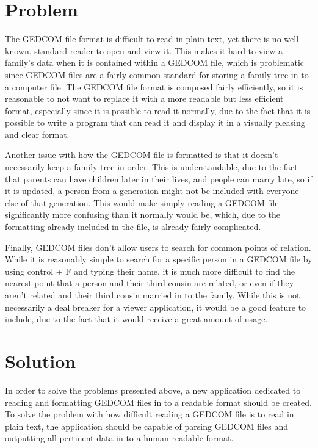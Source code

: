 \documentclass[onecolumn, draftclsnofoot,10pt, compsoc]{IEEEtran}
\begin{document}
\section{Problem}
The GEDCOM file format is difficult to read in plain text, yet there is no well known, standard reader to open and view it. This makes it hard to view a family’s data when it is contained within a GEDCOM file, which is problematic since GEDCOM files are a fairly common standard for storing a family tree in to a computer file. The GEDCOM file format is composed fairly efficiently, so it is reasonable to not want to replace it with a more readable but less efficient format, especially since it is possible to read it normally, due to the fact that it is possible to write a program that can read it and display it in a visually pleasing and clear format.  

Another issue with how the GEDCOM file is formatted is that it doesn’t necessarily keep a family tree in order. This is understandable, due to the fact that parents can have children later in their lives, and people can marry late, so if it is updated, a person from a generation might not be included with everyone else of that generation. This would make simply reading a GEDCOM file significantly more confusing than it normally would be, which, due to the formatting already included in the file, is already fairly complicated. 

Finally, GEDCOM files don’t allow users to search for common points of relation. While it is reasonably simple to search for a specific person in a GEDCOM file by using control + F and typing their name, it is much more difficult to find the nearest point that a person and their third cousin are related, or even if they aren’t related and their third cousin married in to the family. While this is not necessarily a deal breaker for a viewer application, it would be a good feature to include, due to the fact that it would receive a great amount of usage.

\section{Solution}
In order to solve the problems presented above, a new application dedicated to reading and formatting GEDCOM files in to a readable format should be created. To solve the problem with how difficult reading a GEDCOM file is to read in plain text, the application should be capable of parsing GEDCOM files and outputting all pertinent data in to a human-readable format.
\end{document}
